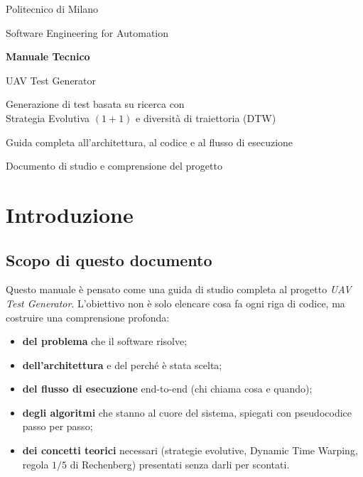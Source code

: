 \documentclass[11pt,a4paper]{report}
\begin{document}

\begin{titlepage}
\centering
\vspace*{2cm}
{\Large Politecnico di Milano\par}
\vspace{0.3cm}
{\large Software Engineering for Automation\par}
\vfill
{\Huge\bfseries\color{PolimiBlue} Manuale Tecnico\par}
\vspace{0.6cm}
{\Large UAV Test Generator\par}
{\large Generazione di test basata su ricerca con\\
Strategia Evolutiva $(1+1)$ e diversità di traiettoria (DTW)\par}
\vfill
{\large Guida completa all'architettura, al codice e al flusso di esecuzione\par}
\vspace{1cm}
{\normalsize Documento di studio e comprensione del progetto\par}
\vfill
\end{titlepage}

\tableofcontents
\clearpage

\chapter{Introduzione}

\section{Scopo di questo documento}
Questo manuale è pensato come una guida di studio completa al progetto
\emph{UAV Test Generator}. L'obiettivo non è solo elencare cosa fa ogni
riga di codice, ma costruire una comprensione profonda:
\begin{itemize}
  \item \textbf{del problema} che il software risolve;
  \item \textbf{dell'architettura} e del perché è stata scelta;
  \item \textbf{del flusso di esecuzione} end-to-end (chi chiama cosa e quando);
  \item \textbf{degli algoritmi} che stanno al cuore del sistema, spiegati
        con pseudocodice passo per passo;
  \item \textbf{dei concetti teorici} necessari (strategie evolutive,
        Dynamic Time Warping, regola $1/5$ di Rechenberg) presentati
        senza darli per scontati.
\end{itemize}
\end{document}

